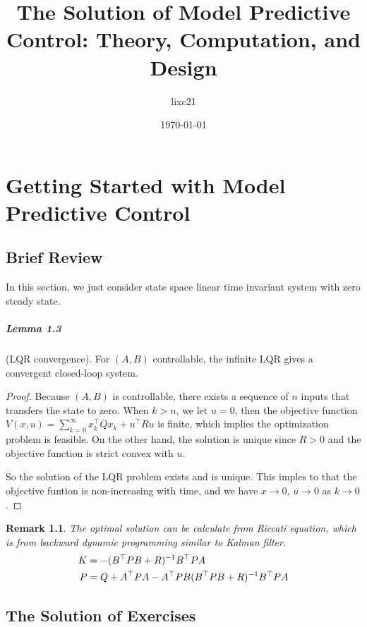 \documentclass[11pt,a4paper]{report}
\title{The Solution of Model Predictive Control: Theory, Computation, and Design}
\author{lixc21}
\date{\today}
\newtheorem*{remark}{Remark}
\begin{document}
\maketitle

\chapter{Getting Started with Model Predictive Control}
\section{Brief Review}
In this section, we just consider state space linear time invariant system with zero steady state.

\paragraph{Lemma 1.3} (LQR convergence). For $(A,B)$ controllable, the infinite LQR gives a convergent closed-loop system.
\begin{proof}
Because $(A,B)$ is controllable, there exists a sequence of $n$ inputs that transfers the state to zero. When $k>n$, we let $u=0$, then the objective function $V(x,u)=\sum_{k=0}^\infty x_k^\top Qx_k+u^\top Ru$ is finite, which implies the optimization problem is feasible. On the other hand, the solution is unique since $R>0$ and the objective function is strict convex with $u$.

So the solution of the LQR problem exists and is unique. This imples to that the objective funtion is non-increasing with time, and we have $x\to 0$, $u\to 0$ as $k\to 0$.
\end{proof}
\begin{remark}
The optimal solution can be calculate from Riccati equation, which is from backward dynamic programming similar to Kalman filter.
\begin{equation}\notag
\begin{aligned}
K&=-(B^\top PB+R)^{-1} B^\top PA\\
P&=Q+A^\top PA-A^\top PB(B^\top PB+R)^{-1}B^\top PA
\end{aligned}
\end{equation}
\end{remark}

\section{The Solution of Exercises}
\end{document}

